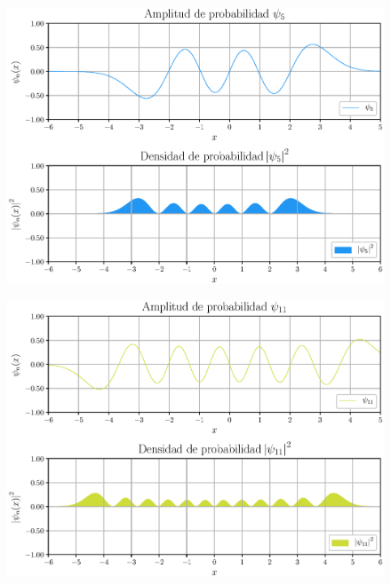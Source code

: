 \documentclass[12pt]{beamer}
\begin{document}
\begin{frame}[plain]
\begin{figure}[H]
    \centering
    \includegraphics[scale=0.5]{Imagenes/Funcion_Onda_05.eps}
\end{figure}
\end{frame}
\begin{frame}[plain]
\begin{figure}[H]
\centering
\includegraphics[scale=0.5]{Imagenes/Funcion_Onda_011.eps}
\end{figure}
\end{frame}
\end{document}
